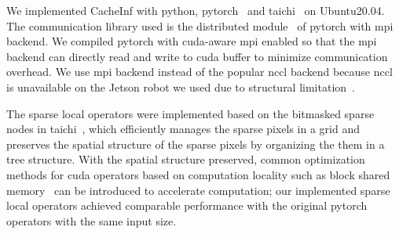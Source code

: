 We implemented CacheInf with python, pytorch~\cite{paszke2017automatic} and taichi~\cite{taichi} on Ubuntu20.04.
The communication library used is the distributed module~\cite{torch_distributed} of pytorch with mpi backend.
We compiled pytorch with cuda-aware mpi enabled so that the mpi backend can directly read and write to cuda buffer to minimize communication overhead.
We use mpi backend instead of the popular nccl backend because nccl is unavailable on the Jetson robot we used due to structural limitation~\cite{noauthor_can_2022}.

The sparse local operators were implemented based on the bitmasked sparse nodes in taichi~\cite{taichi}, which efficiently manages the sparse pixels in a grid and preserves the spatial structure of the sparse pixels by organizing the them in a tree structure. 
With the spatial structure preserved, common optimization methods for cuda operators based on computation locality such as block shared memory~\cite{noauthor_using_2013} can be introduced to accelerate computation; our implemented sparse local operators achieved comparable performance with the original pytorch operators with the same input size.

